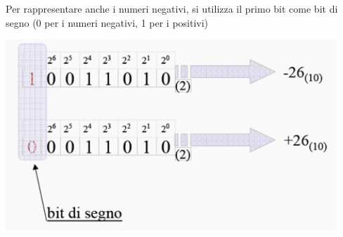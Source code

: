 \documentclass[
  paper=a4,
  oneside  ,captions=tableheading
]{scrbook}
\begin{document}
Per rappresentare anche i numeri negativi, si utilizza il primo bit come
bit di segno (0 per i numeri negativi, 1 per i positivi)
\begin{center}
\includegraphics{./image/image-20201212110945997.png}
\end{center}
\end{document}
